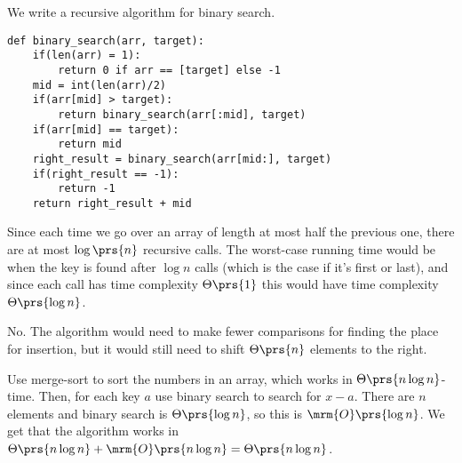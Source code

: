 \documentclass[oneside]{scrbook}
\theoremstyle{definition}
\begin{document}
\begin{exercise}
    We write a recursive algorithm for binary search.
\begin{lstlisting}
def binary_search(arr, target):
	if(len(arr) = 1):
		return 0 if arr == [target] else -1
	mid = int(len(arr)/2)
	if(arr[mid] > target):
		return binary_search(arr[:mid], target)
	if(arr[mid] == target):
		return mid	
	right_result = binary_search(arr[mid:], target)
	if(right_result == -1):
		return -1
	return right_result + mid
\end{lstlisting}
Since each time we go over an array of length at most half the previous one, there are at most $\log\prs{n}$ recursive calls. The worst-case running time would be when the key is found after $\log n$ calls (which is the case if it's first or last), and since each call has time complexity $\Theta\prs{1}$ this would have time complexity $\Theta\prs{\log n}$.
\end{exercise}

\begin{exercise}
    No. The algorithm would need to make fewer comparisons for finding the place for insertion, but it would still need to shift $\Theta\prs{n}$ elements to the right.
\end{exercise}

\begin{exercise}
    Use merge-sort to sort the numbers in an array, which works in $\Theta\prs{n \log n}$-time. Then, for each key $a$ use binary search to search for $x-a$. There are $n$ elements and binary search is $\Theta\prs{\log n}$, so this is $\mrm{O}\prs{\log n}$. We get that the algorithm works in $\Theta\prs{n \log n} + \mrm{O}\prs{n \log n} = \Theta\prs{n \log n}$.
\end{exercise}
\end{document}
